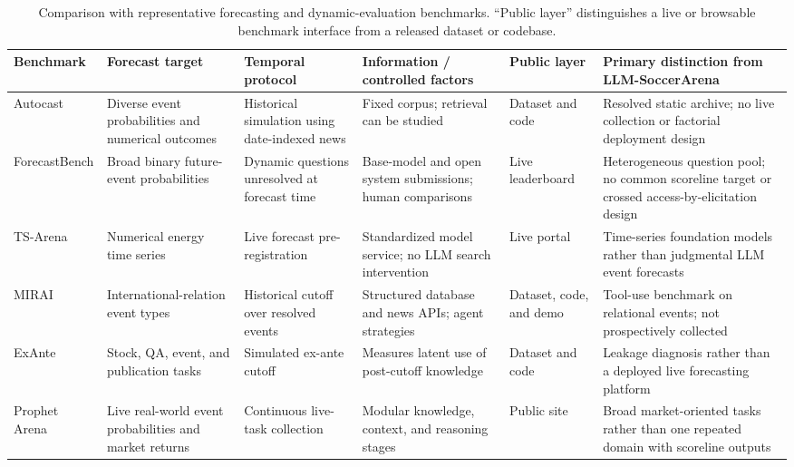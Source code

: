 \documentclass[sigconf,review]{acmart}
\newcommand{\arena}{\mbox{LLM-SoccerArena}\xspace}
\begin{document}
\begin{table}[t]
  \centering
  \caption{Comparison with representative forecasting and dynamic-evaluation benchmarks. ``Public
  layer'' distinguishes a live or browsable benchmark interface from a released dataset or codebase.}
  \label{tab:benchmark_comparison}
  \scriptsize
  \setlength{\tabcolsep}{3pt}
  \renewcommand{\arraystretch}{1.16}
  \begin{tabularx}{\textwidth}{@{}p{2.15cm}p{2.45cm}p{2.75cm}p{2.85cm}p{1.65cm}X@{}}
    \hline
    \textbf{Benchmark} & \textbf{Forecast target} & \textbf{Temporal protocol} &
    \textbf{Information / controlled factors} & \textbf{Public layer} &
    \textbf{Primary distinction from \arena} \\
    \hline
    Autocast \citep{autocast} & Diverse event probabilities and numerical outcomes &
    Historical simulation using date-indexed news & Fixed corpus; retrieval can be studied &
    Dataset and code & Resolved static archive; no live collection or factorial deployment design \\
    ForecastBench \citep{forecastbench} & Broad binary future-event probabilities &
    Dynamic questions unresolved at forecast time & Base-model and open system submissions; human
    comparisons & Live leaderboard & Heterogeneous question pool; no common scoreline target or
    crossed access-by-elicitation design \\
    TS-Arena \citep{tsarena} & Numerical energy time series & Live forecast pre-registration &
    Standardized model service; no LLM search intervention & Live portal & Time-series foundation
    models rather than judgmental LLM event forecasts \\
    MIRAI \citep{mirai} & International-relation event types & Historical cutoff over resolved events &
    Structured database and news APIs; agent strategies & Dataset, code, and demo & Tool-use benchmark
    on relational events; not prospectively collected \\
    ExAnte \citep{exante} & Stock, QA, event, and publication tasks & Simulated ex-ante cutoff &
    Measures latent use of post-cutoff knowledge & Dataset and code & Leakage diagnosis rather than a
    deployed live forecasting platform \\
    Prophet Arena \citep{prophetarena} & Live real-world event probabilities and market returns &
    Continuous live-task collection & Modular knowledge, context, and reasoning stages & Public site &
    Broad market-oriented tasks rather than one repeated domain with scoreline outputs \\

\end{tabularx}
\end{table}
\end{document}
